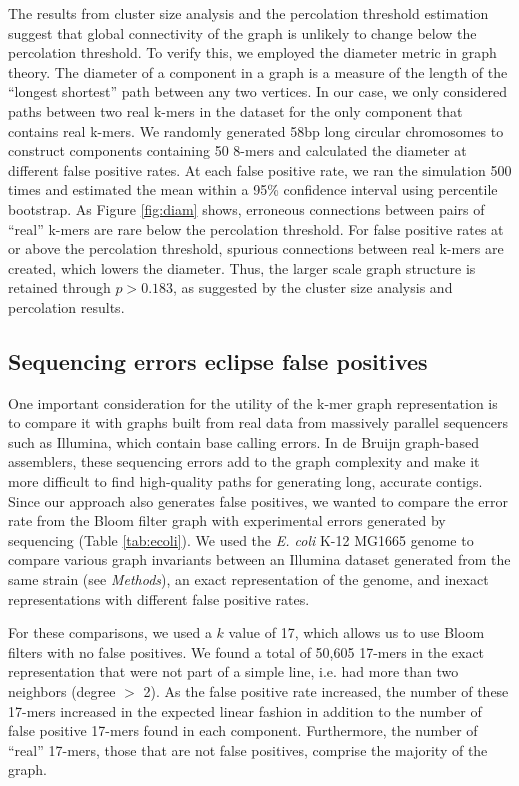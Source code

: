\documentclass{pnastwo}
\begin{document}
\begin{article}
The results from cluster size analysis and the percolation threshold
estimation suggest that global connectivity of the graph is unlikely
to change below the percolation threshold. To verify this, we employed
the diameter metric in graph theory.  The diameter of a component in a
graph is a measure of the length of the ``longest shortest'' path
between any two vertices\cite{bondy2008graph}.  In our case, we only
considered paths between two real k-mers in the dataset for the only
component that contains real k-mers.  We randomly generated 58bp long
circular chromosomes to construct components containing 50 8-mers and
calculated the diameter at different false positive rates. At each
false positive rate, we ran the simulation 500 times and estimated the
mean within a 95\% confidence interval using percentile bootstrap. As Figure \ref{fig:diam} shows, erroneous
connections between pairs of ``real'' k-mers are rare below the
percolation threshold. For false positive rates at or above the
percolation threshold, spurious connections between real k-mers are
created, which lowers the diameter.  Thus, the larger scale graph
structure is retained through $p > 0.183$, as suggested by the cluster
size analysis and percolation results.

\subsection{Sequencing errors eclipse false positives}

One important consideration for the utility of the k-mer graph
representation is to compare it with graphs built from real data from
massively parallel sequencers such as Illumina, which contain base
calling errors.  In de Bruijn graph-based assemblers, these sequencing
errors add to the graph complexity and make it more difficult to find
high-quality paths for generating long, accurate contigs. Since our
approach also generates false positives, we wanted to compare the
error rate from the Bloom filter graph with experimental errors
generated by sequencing (Table \ref{tab:ecoli}). We used the \emph{E. coli} K-12
MG1665 genome to compare various graph invariants between an Illumina
dataset generated from the same strain (see \emph{Methods}), an exact
representation of the genome, and inexact representations with
different false positive rates.

For these comparisons, we used a $k$ value of 17, which allows us to
use Bloom filters with no false positives.
We found a
total of 50,605 17-mers in the exact representation that were not part
of a simple line, i.e. had more than two neighbors (degree $>$ 2). As
the false positive rate increased, the number of these 17-mers
increased in the expected linear fashion in addition to the number of
false positive 17-mers found in each component. Furthermore, the
number of ``real'' 17-mers, those that are not false positives,
comprise the majority of the graph.


\end{article}
\end{document}
